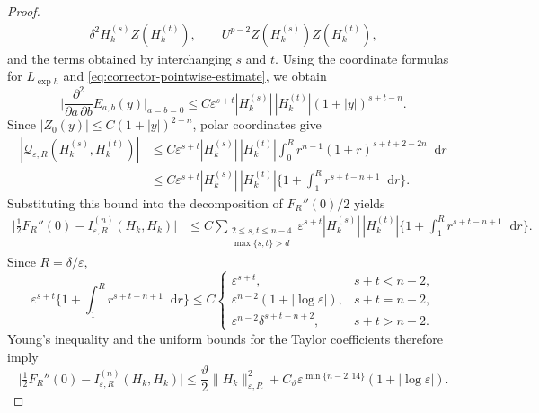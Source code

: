\documentclass[11pt]{article}
\numberwithin{equation}{section}
\theoremstyle{remark}
\newcommand{\dd}{\mathop{}\!\mathrm{d}}
\begin{document}
\begin{proof}
\begin{equation*}
\begin{gathered}
 \delta^2H_k^{(s)}
 Z(H_k^{(t)}),\qquad
 U^{p-2}Z(H_k^{(s)})Z(H_k^{(t)}),
\end{gathered}
\end{equation*}
 and the terms obtained by interchanging $s$ and $t$.  {Using the coordinate
formulas for $L_{\exp h}$ and
\eqref{eq:corrector-pointwise-estimate}, we obtain}
{
\begin{equation*}
 \bigg|\frac{\partial^2}{\partial a\,\partial b}
 E_{a,b}(y)\bigg|_{a=b=0}
 \le C\varepsilon^{s+t}|H_k^{(s)}|\,|H_k^{(t)}|
       (1+|y|)^{s+t-n}.
\end{equation*}
}
Since
$|Z_0(y)|\le C(1+|y|)^{2-n}$, polar coordinates give
{
\begin{equation*}
\begin{aligned}
 |\mathcal Q_{\varepsilon,R}(H_k^{(s)},H_k^{(t)})|
 &\le C\varepsilon^{s+t}|H_k^{(s)}|\,|H_k^{(t)}|
 \int_0^Rr^{n-1}(1+r)^{s+t+2-2n}\dd r\\
 &\le C\varepsilon^{s+t}|H_k^{(s)}|\,|H_k^{(t)}|
 \Biggl\{1+\int_1^Rr^{s+t-n+1}\dd r\Biggr\}.
\end{aligned}
\end{equation*}
}
Substituting this bound into the decomposition
of $F_R''(0)/2$ yields
{
\begin{equation*}
\begin{aligned}
 \big|\tfrac12F_R''(0)-I_{\varepsilon,R}^{(n)}(H_k,H_k)\big|
 &\le C\sum_{\substack{2\le s,t\le n-4\\\max\{s,t\}>d}}
 \varepsilon^{s+t}|H_k^{(s)}|\,|H_k^{(t)}|
 \Biggl\{1+\int_1^Rr^{s+t-n+1}\dd r\Biggr\}.
\end{aligned}
\end{equation*}
}
Since $R=\delta/\varepsilon$,
{
\begin{equation}\label{eq:actual-radial-trichotomy}
 \varepsilon^{s+t}
 \Biggl\{1+\int_1^Rr^{s+t-n+1}\dd r\Biggr\}
 \le C
 \begin{cases}
  \varepsilon^{s+t},&s+t<n-2,\\
  \varepsilon^{n-2}(1+|\log\varepsilon|),&s+t=n-2,\\
  \varepsilon^{n-2}\delta^{s+t-n+2},&s+t>n-2.
 \end{cases}
\end{equation}
}
Young's inequality and the uniform bounds for the Taylor coefficients therefore
imply
{
\begin{equation*}
 \big|\tfrac12F_R''(0)-I_{\varepsilon,R}^{(n)}(H_k,H_k)\big|
 \le\frac{\vartheta}{2}
 \|H_k\|_{\varepsilon,R}^2
 +C_\vartheta\varepsilon^{\min\{n-2,14\}}
 (1+|\log\varepsilon|).
\end{equation*}
}


\end{proof}
\end{document}
